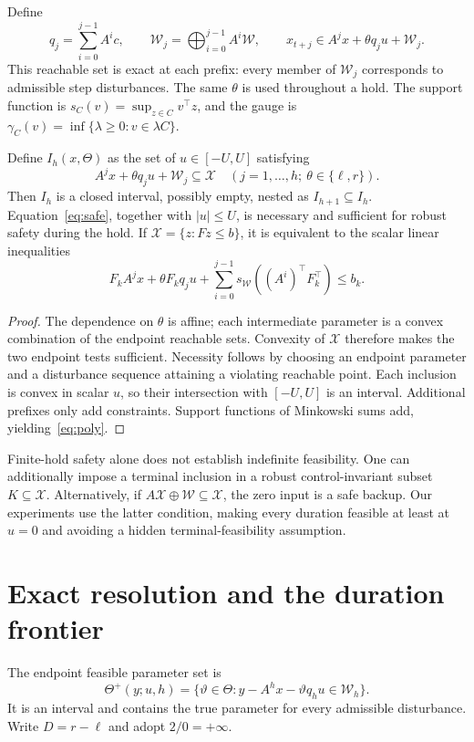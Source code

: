 \documentclass{l4dc2026}
\newcommand{\W}{\mathcal{W}}
\newcommand{\X}{\mathcal{X}}
\newcommand{\gauge}{\gamma}
\begin{document}
Define
\begin{equation}\label{eq:lift}
 q_j=\sum_{i=0}^{j-1}A^i c,\qquad
 \W_j=\bigoplus_{i=0}^{j-1}A^i\W,\qquad
 x_{t+j}\in A^jx+\theta q_j u+\W_j.
\end{equation}
This reachable set is exact at each prefix: every member of $\W_j$ corresponds to admissible step disturbances. The same $\theta$ is used throughout a hold. The support function is $s_C(v)=\sup_{z\in C}v^\top z$, and the gauge is $\gauge_C(v)=\inf\{\lambda\ge0:v\in\lambda C\}$.

\begin{lemma}\label{lem:safe}
Define $I_h(x,\Theta)$ as the set of $u\in[-U,U]$ satisfying
\begin{equation}\label{eq:safe}
 A^jx+\theta q_j u+\W_j\subseteq\X
 \quad(j=1,\ldots,h;\ \theta\in\{\ell,r\}).
\end{equation}
Then $I_h$ is a closed interval, possibly empty, nested as $I_{h+1}\subseteq I_h$. Equation~\eqref{eq:safe}, together with $|u|\le U$, is necessary and sufficient for robust safety during the hold. If $\X=\{z:Fz\le b\}$, it is equivalent to the scalar linear inequalities
\begin{equation}\label{eq:poly}
 F_k A^jx+\theta F_kq_j u+\sum_{i=0}^{j-1}s_\W((A^i)^\top F_k^\top)\le b_k.
\end{equation}
\end{lemma}
\begin{proof}
The dependence on $\theta$ is affine; each intermediate parameter is a convex combination of the endpoint reachable sets. Convexity of $\X$ therefore makes the two endpoint tests sufficient. Necessity follows by choosing an endpoint parameter and a disturbance sequence attaining a violating reachable point. Each inclusion is convex in scalar $u$, so their intersection with $[-U,U]$ is an interval. Additional prefixes only add constraints. Support functions of Minkowski sums add, yielding~\eqref{eq:poly}.
\end{proof}

Finite-hold safety alone does not establish indefinite feasibility. One can additionally impose a terminal inclusion in a robust control-invariant subset $K\subseteq\X$. Alternatively, if $A\X\oplus\W\subseteq\X$, the zero input is a safe backup. Our experiments use the latter condition, making every duration feasible at least at $u=0$ and avoiding a hidden terminal-feasibility assumption.

\section{Exact resolution and the duration frontier}
The endpoint feasible parameter set is
\begin{equation}\label{eq:post}
 \Theta^+(y;u,h)=\{\vartheta\in\Theta:y-A^h x-\vartheta q_hu\in\W_h\}.
\end{equation}
It is an interval and contains the true parameter for every admissible disturbance. Write $D=r-\ell$ and adopt $2/0=+\infty$.
\end{document}
